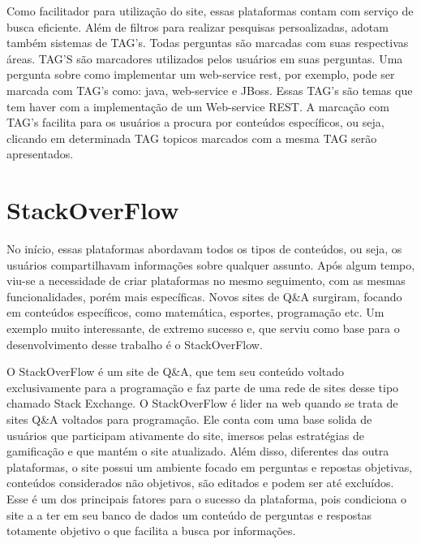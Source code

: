 Como facilitador para utilização do site, essas plataformas contam com serviço de busca eficiente. Além de filtros para realizar pesquisas persoalizadas, adotam também sistemas de TAG's. Todas perguntas são marcadas com suas respectivas áreas.
TAG'S são marcadores utilizados pelos usuários em suas perguntas. Uma pergunta sobre como implementar um web-service rest, por exemplo, pode ser marcada com TAG's como: java, web-service e JBoss. Essas TAG's são temas que tem haver com a implementação de 
um Web-service REST. A marcação com TAG's facilita para os usuários a procura por conteúdos específicos, ou seja, clicando em determinada TAG topicos marcados com a mesma TAG serão apresentados.

\section{StackOverFlow}%

No início, essas plataformas abordavam todos os tipos de conteúdos, ou seja, os usuários compartilhavam informações sobre qualquer assunto. Após algum tempo, viu-se a necessidade de criar plataformas no mesmo seguimento, com as mesmas
 funcionalidades, porém mais específicas. Novos sites de Q\&A surgiram, focando em conteúdos específicos, como matemática, esportes, programação etc. Um exemplo muito interessante, de extremo sucesso e, que serviu como base para o desenvolvimento
 desse trabalho é o StackOverFlow.

O StackOverFlow é um site de Q\&A, que tem seu conteúdo voltado exclusivamente para a programação e faz parte de uma rede de sites desse tipo chamado Stack Exchange. O StackOverFlow é lider na web quando se trata de sites Q\&A voltados para programação.
Ele conta com uma base solida de usuários que participam ativamente do site, imersos pelas estratégias de gamificação e que mantém o site atualizado. Além disso, diferentes das outra plataformas, o site possui um ambiente focado em perguntas e repostas objetivas,
conteúdos considerados não objetivos, são editados e podem ser até excluídos. Esse é um dos principais fatores para o sucesso da plataforma, pois condiciona o site a a ter em seu banco de dados um conteúdo de perguntas e respostas totamente objetivo o que facilita
 a busca por informações. 